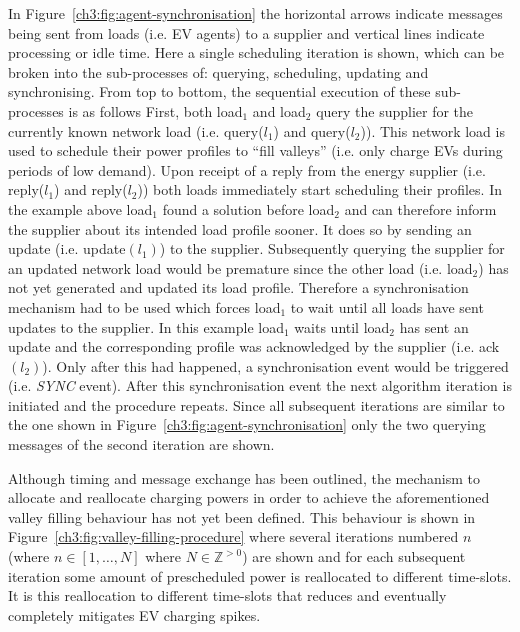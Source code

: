 

In Figure~\ref{ch3:fig:agent-synchronisation} the horizontal arrows indicate messages being sent from loads (i.e. EV agents) to a supplier and vertical lines indicate processing or idle time.
Here a single scheduling iteration is shown, which can be broken into the sub-processes of: querying, scheduling, updating and synchronising.
From top to bottom, the sequential execution of these sub-processes is as follows
First, both load$_1$ and load$_2$ query the supplier for the currently known network load (i.e. query($l_1$) and query($l_2$)).
This network load is used to schedule their power profiles to ``fill valleys'' (i.e. only charge EVs during periods of low demand).
Upon receipt of a reply from the energy supplier (i.e. reply($l_1$) and reply($l_2$)) both loads immediately start scheduling their profiles.
In the example above load$_1$ found a solution before load$_2$ and can therefore inform the supplier about its intended load profile sooner.
It does so by sending an update (i.e. update$(l_1)$) to the supplier.
Subsequently querying the supplier for an updated network load would be premature since the other load (i.e. load$_2$) has not yet generated and updated its load profile.
Therefore a synchronisation mechanism had to be used which forces load$_1$ to wait until all loads have sent updates to the supplier.
In this example load$_1$ waits until load$_2$ has sent an update and the corresponding profile was acknowledged by the supplier (i.e. ack$(l_2)$).
Only after this had happened, a synchronisation event would be triggered (i.e. \textit{SYNC} event).
After this synchronisation event the next algorithm iteration is initiated and the procedure repeats.
Since all subsequent iterations are similar to the one shown in Figure~\ref{ch3:fig:agent-synchronisation} only the two querying messages of the second iteration are shown.

Although timing and message exchange has been outlined, the mechanism to allocate and reallocate charging powers in order to achieve the aforementioned valley filling behaviour has not yet been defined.
This behaviour is shown in Figure~\ref{ch3:fig:valley-filling-procedure} where several iterations numbered $n$ (where $n \in [1, \dots, N]$ where $N \in \mathbb{Z}^{>0}$) are shown and for each subsequent iteration some amount of prescheduled power is reallocated to different time-slots.
It is this reallocation to different time-slots that reduces and eventually completely mitigates EV charging spikes.


